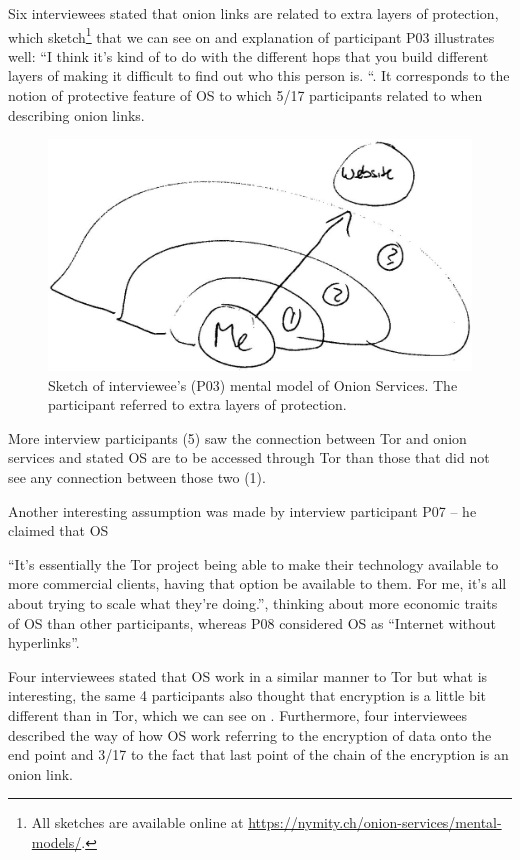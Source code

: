Six interviewees stated that onion links are related to extra layers of protection, which sketch\footnote{All sketches are available online at
\url{https://nymity.ch/onion-services/mental-models/}.} that we can see on  and explanation of participant P03 illustrates well:   “I think it's kind of to do with the different hops that you build different layers of making it difficult to find out who this person is. “. It corresponds to the notion of protective feature of OS to which 5/17 participants related to when describing onion links.


\begin{figure}[!ht]
    \centering
        \centering
        \includegraphics[width=0.8\linewidth]{figures/p03-os-sketch-kopia2.jpg}
        \caption{Sketch of interviewee's (P03) mental model of Onion Services. The participant referred to extra layers of protection.}
        \label{fig:os-sketch}
\end{figure}

More interview participants (5) saw the connection between Tor and onion services and stated OS are to be accessed through Tor than those that did not see any connection between those two (1).

Another interesting assumption was made by interview participant P07 – he claimed that OS 

“It's essentially the Tor project being able to make their technology available to more commercial clients, having that option be available to them. For me, it's all about trying to scale what they're doing.”, thinking about more economic traits of OS than other participants, whereas P08 considered OS as “Internet without hyperlinks”.

Four interviewees stated that OS work in a similar manner to Tor but what is interesting, the same 4 participants also thought that encryption is a little bit different than in Tor, which we can see on . Furthermore, four interviewees described the way of how OS work referring to the encryption of data onto the end point and 3/17 to the fact that last point of the chain of the encryption is an onion link. 


